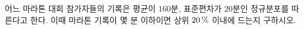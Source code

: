 어느 마라톤 대회 참가자들의 기록은 평균이 $160$분, 표준편차가 $20$분인 정규분포를 따른다고 한다. 이때 마라톤 기록이 몇 분 이하이면 상위 $20\mkern3mu \%$ 이내에 드는지 구하시오. 
